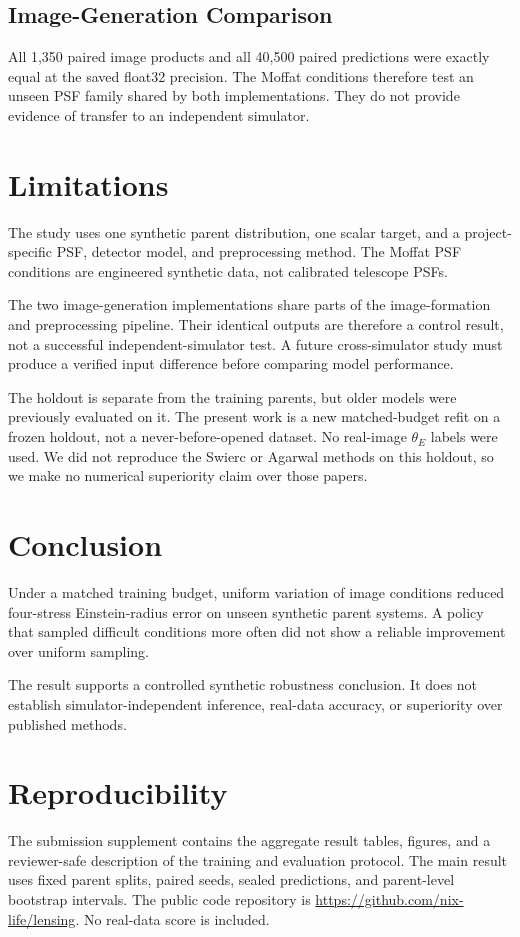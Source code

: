 \documentclass[letterpaper]{article}
\begin{document}
\subsection{Image-Generation Comparison}

All 1,350 paired image products and all 40,500 paired predictions were exactly
equal at the saved float32 precision. The Moffat conditions therefore test an
unseen PSF family shared by both implementations. They do not provide evidence
of transfer to an independent simulator.

\section{Limitations}

The study uses one synthetic parent distribution, one scalar target, and a
project-specific PSF, detector model, and preprocessing method. The Moffat PSF
conditions are engineered synthetic data, not calibrated telescope PSFs.

The two image-generation implementations share parts of the image-formation
and preprocessing pipeline. Their identical outputs are therefore a control
result, not a successful independent-simulator test. A future cross-simulator
study must produce a verified input difference before comparing model
performance.

The holdout is separate from the training parents, but older models were
previously evaluated on it. The present work is a new matched-budget refit on a
frozen holdout, not a never-before-opened dataset. No real-image
$\theta_E$ labels were used. We did not reproduce the Swierc or Agarwal methods
on this holdout, so we make no numerical superiority claim over those papers.

\section{Conclusion}

Under a matched training budget, uniform variation of image conditions reduced
four-stress Einstein-radius error on unseen synthetic parent systems. A policy
that sampled difficult conditions more often did not show a reliable
improvement over uniform sampling.

The result supports a controlled synthetic robustness conclusion. It does not
establish simulator-independent inference, real-data accuracy, or superiority
over published methods.

\section*{Reproducibility}

The submission supplement contains the aggregate result tables, figures, and a
reviewer-safe description of the training and evaluation protocol. The main
result uses fixed parent splits, paired seeds, sealed predictions, and
parent-level bootstrap intervals. The public code repository is
\url{https://github.com/nix-life/lensing}. No real-data score is included.



\end{document}
